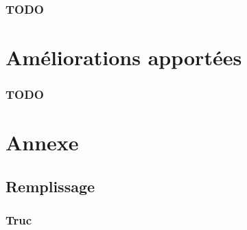 \documentclass[c, 11pt, handout, xcolor=table]{beamer}
\begin{document}
\begin{frame}
 \frametitle{TODO}
\end{frame}

\section{Améliorations apportées}

\begin{frame}
 \frametitle{TODO}
\end{frame}






\appendix

\section{Annexe}
\subsection{Remplissage}
\begin{frame}
 \frametitle{Truc}
\end{frame}
 
\end{document}
